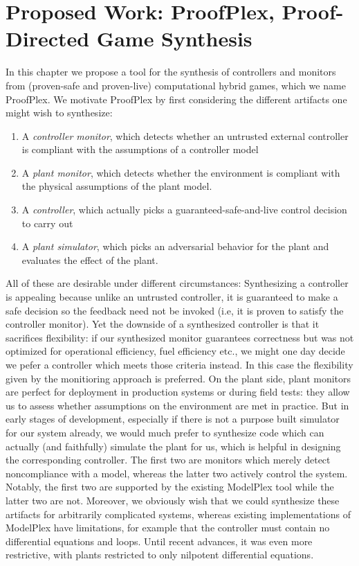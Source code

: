 \documentclass[12pt]{cmuthesis}
\theoremstyle{definition}
\theoremstyle{remark}
\newcommand{\ProofPlex}{ProofPlex\xspace}
\newcommand{\ModelPlex}{ModelPlex\xspace}
\begin{document}
\chapter{Proposed Work: \ProofPlex, Proof-Directed Game Synthesis}
\label{ch:proofplex}
In this chapter we propose a tool for the synthesis of controllers and monitors from (proven-safe and proven-live) computational hybrid games, which we name \ProofPlex.
We motivate \ProofPlex by first considering the different artifacts one might wish to synthesize:
\begin{enumerate}
\item A \emph{controller monitor}, which detects whether an untrusted external controller is compliant with the assumptions of a controller model
\item A \emph{plant monitor}, which detects whether the environment is compliant with the physical assumptions of the plant model.
\item A \emph{controller}, which actually picks a guaranteed-safe-and-live control decision to carry out
\item A \emph{plant simulator}, which picks an adversarial behavior for the plant and evaluates the effect of the plant.
\end{enumerate}

All of these are desirable under different circumstances:
Synthesizing a controller is appealing because unlike an untrusted controller, it is guaranteed to make a safe decision so the feedback need not be invoked (i.e, it is proven to satisfy the controller monitor).
Yet the downside of a synthesized controller is that it sacrifices flexibility: if our synthesized monitor guarantees correctness but was not optimized for operational efficiency, fuel efficiency etc., we might one day decide we pefer a controller which meets those criteria instead.
In this case the flexibility given by the monitioring approach is preferred.
On the plant side, plant monitors are perfect for deployment in production systems or during field tests: they allow us to assess whether assumptions on the environment are met in practice.
But in early stages of development, especially if there is not a purpose built simulator for our system already, we would much prefer to synthesize code which can actually (and faithfully) simulate the plant for us, which is helpful in designing the corresponding controller.
The first two are monitors which merely detect noncompliance with a model, whereas the latter two actively control the system.
Notably, the first two are supported by the existing \ModelPlex tool while the latter two are not.
Moreover, we obviously wish that we could synthesize these artifacts for arbitrarily complicated systems, whereas existing implementations of \ModelPlex have limitations, for example that the controller must contain no differential equations and loops.
Until recent advances, it was even more restrictive, with plants restricted to only nilpotent differential equations.
\end{document}
